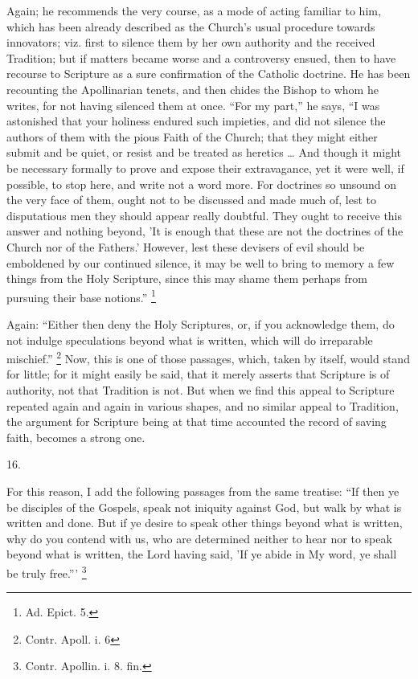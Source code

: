 Again; he recommends the very course, as a mode of acting familiar
to him, which has been already described as the Church's usual
procedure towards innovators; viz. first to silence them by her
own authority and the received Tradition; but if matters became worse
and a controversy ensued, then to have recourse to Scripture as a sure
confirmation of the Catholic doctrine. He has been recounting the
Apollinarian tenets, and then chides the Bishop to whom he writes, for
not having silenced them at once. ``For my part,'' he says,
``I was astonished that your holiness endured such impieties, and
did not silence the authors of them with the pious Faith of the
Church; that they might either submit and be quiet, or resist and be
treated as heretics … And though it might be necessary formally to
prove and expose their extravagance, yet it were well, if possible, to
stop here, and write not a word more. For doctrines so unsound on the
very face of them, ought not to be discussed and made much of, lest to
disputatious men they should appear really doubtful. They ought to
receive this answer and nothing beyond, 'It is enough that these are
not the doctrines of the Church nor of the Fathers.' However, lest
these devisers of evil should be emboldened by our continued silence,
it may be well to bring to memory a few things from the Holy
Scripture, since this may shame them perhaps from pursuing their base
notions.'' \footnote{Ad. Epict. 5.}

Again: ``Either then deny the Holy Scriptures, or, if you
acknowledge them, do not indulge speculations beyond what is written,
which will do irreparable mischief.'' \footnote{Contr. Apoll. i. 6} Now, this is one
of those passages, which, taken by itself, would stand for little; for
it might easily be said, that it merely asserts that Scripture is of
authority, not that Tradition is not. But when we find this appeal to
Scripture repeated again and again in various shapes, and no similar
appeal to Tradition, the argument for Scripture being at that time
accounted the record of saving faith, becomes a strong one.

16.

For this reason, I add the following passages from the same
treatise: ``If then ye be disciples of the Gospels, speak not
iniquity against God, but walk by what is written and done. But if ye
desire to speak other things beyond what is written, why do you
contend with us, who are determined neither to hear nor to speak
beyond what is written, the Lord having said, 'If ye abide in My word,
ye shall be truly free.''' \footnote{Contr. Apollin. i. 8. fin.}


